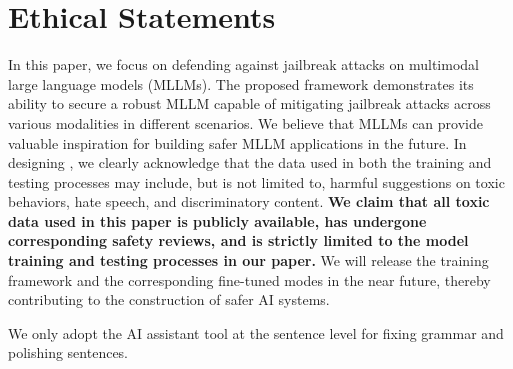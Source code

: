 \section{Ethical Statements}
In this paper, we focus on defending against jailbreak attacks on multimodal large language models (MLLMs). The proposed {\name} framework demonstrates its ability to secure a robust MLLM capable of mitigating jailbreak attacks across various modalities in different scenarios. 
We believe that {\name} MLLMs can provide valuable inspiration for building safer MLLM applications in the future.
In designing {\name}, we clearly acknowledge that the data used in both the training and testing processes may include, but is not limited to, harmful suggestions on toxic behaviors, hate speech, and discriminatory content. \textbf{We claim that all toxic data used in this paper is publicly available, has undergone corresponding safety reviews, and is strictly limited to the model training and testing processes in our paper.} We will release the {\name} training framework and the corresponding fine-tuned modes in the near future, thereby contributing to the construction of safer AI systems.

 We only adopt the AI assistant tool at the sentence level for fixing grammar and polishing sentences.











